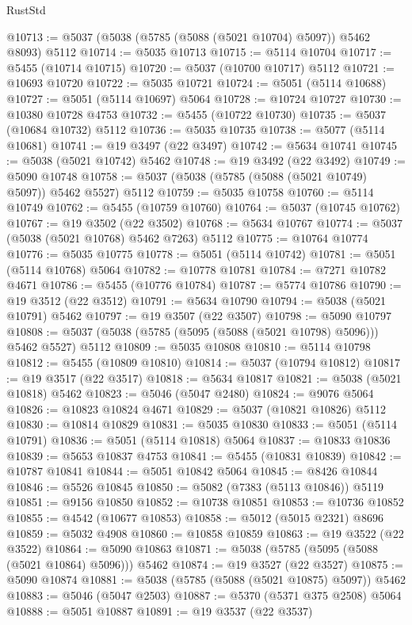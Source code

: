 \begin{lexlean}{RustStd}
\begin{coremodule}
@10713 := @5037 (@5038 (@5785 (@5088 (@5021 @10704) @5097)) @5462 @8093) @5112
@10714 := @5035 @10713
@10715 := @5114 @10704
@10717 := @5455 (@10714 @10715)
@10720 := @5037 (@10700 @10717) @5112
@10721 := @10693 @10720
@10722 := @5035 @10721
@10724 := @5051 (@5114 @10688)
@10727 := @5051 (@5114 @10697) @5064
@10728 := @10724 @10727
@10730 := @10380 @10728 @4753
@10732 := @5455 (@10722 @10730)
@10735 := @5037 (@10684 @10732) @5112
@10736 := @5035 @10735
@10738 := @5077 (@5114 @10681)
@10741 := @19 @3497 (@22 @3497)
@10742 := @5634 @10741
@10745 := @5038 (@5021 @10742) @5462
@10748 := @19 @3492 (@22 @3492)
@10749 := @5090 @10748
@10758 := @5037 (@5038 (@5785 (@5088 (@5021 @10749) @5097)) @5462 @5527) @5112
@10759 := @5035 @10758
@10760 := @5114 @10749
@10762 := @5455 (@10759 @10760)
@10764 := @5037 (@10745 @10762)
@10767 := @19 @3502 (@22 @3502)
@10768 := @5634 @10767
@10774 := @5037 (@5038 (@5021 @10768) @5462 @7263) @5112
@10775 := @10764 @10774
@10776 := @5035 @10775
@10778 := @5051 (@5114 @10742)
@10781 := @5051 (@5114 @10768) @5064
@10782 := @10778 @10781
@10784 := @7271 @10782 @4671
@10786 := @5455 (@10776 @10784)
@10787 := @5774 @10786
@10790 := @19 @3512 (@22 @3512)
@10791 := @5634 @10790
@10794 := @5038 (@5021 @10791) @5462
@10797 := @19 @3507 (@22 @3507)
@10798 := @5090 @10797
@10808 := @5037 (@5038 (@5785 (@5095 (@5088 (@5021 @10798) @5096))) @5462 @5527) @5112
@10809 := @5035 @10808
@10810 := @5114 @10798
@10812 := @5455 (@10809 @10810)
@10814 := @5037 (@10794 @10812)
@10817 := @19 @3517 (@22 @3517)
@10818 := @5634 @10817
@10821 := @5038 (@5021 @10818) @5462
@10823 := @5046 (@5047 @2480)
@10824 := @9076 @5064
@10826 := @10823 @10824 @4671
@10829 := @5037 (@10821 @10826) @5112
@10830 := @10814 @10829
@10831 := @5035 @10830
@10833 := @5051 (@5114 @10791)
@10836 := @5051 (@5114 @10818) @5064
@10837 := @10833 @10836
@10839 := @5653 @10837 @4753
@10841 := @5455 (@10831 @10839)
@10842 := @10787 @10841
@10844 := @5051 @10842 @5064
@10845 := @8426 @10844
@10846 := @5526 @10845
@10850 := @5082 (@7383 (@5113 @10846)) @5119
@10851 := @9156 @10850
@10852 := @10738 @10851
@10853 := @10736 @10852
@10855 := @4542 (@10677 @10853)
@10858 := @5012 (@5015 @2321) @8696
@10859 := @5032 @4908
@10860 := @10858 @10859
@10863 := @19 @3522 (@22 @3522)
@10864 := @5090 @10863
@10871 := @5038 (@5785 (@5095 (@5088 (@5021 @10864) @5096))) @5462
@10874 := @19 @3527 (@22 @3527)
@10875 := @5090 @10874
@10881 := @5038 (@5785 (@5088 (@5021 @10875) @5097)) @5462
@10883 := @5046 (@5047 @2503)
@10887 := @5370 (@5371 @375 @2508) @5064
@10888 := @5051 @10887
@10891 := @19 @3537 (@22 @3537)

\end{coremodule}
\end{lexlean}
